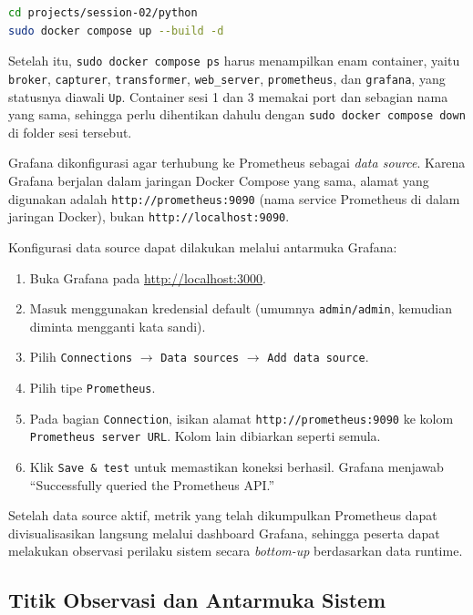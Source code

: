 \begin{enumerate}
\begin{lstlisting}[language=bash, caption={Membangun dan menjalankan seluruh container}, label={lst:ch02-11}]
cd projects/session-02/python
sudo docker compose up --build -d
\end{lstlisting}

Setelah itu, \texttt{sudo docker compose ps} harus menampilkan enam container, yaitu \texttt{broker}, \texttt{capturer}, \texttt{transformer}, \texttt{web\_server}, \texttt{prometheus}, dan \texttt{grafana}, yang statusnya diawali \texttt{Up}. Container sesi 1 dan 3 memakai port dan sebagian nama yang sama, sehingga perlu dihentikan dahulu dengan \texttt{sudo docker compose down} di folder sesi tersebut.



Grafana dikonfigurasi agar terhubung ke Prometheus sebagai \emph{data source}. Karena Grafana berjalan dalam jaringan Docker Compose yang sama, alamat yang digunakan adalah \texttt{http://prometheus:9090} (nama service Prometheus di dalam jaringan Docker), bukan \texttt{http://localhost:9090}.

Konfigurasi data source dapat dilakukan melalui antarmuka Grafana:
\begin{enumerate}
  \item Buka Grafana pada \url{http://localhost:3000}.
  \item Masuk menggunakan kredensial default (umumnya \texttt{admin/admin}, kemudian diminta mengganti kata sandi).
  \item Pilih \texttt{Connections} $\rightarrow$ \texttt{Data sources} $\rightarrow$ \texttt{Add data source}.
  \item Pilih tipe \texttt{Prometheus}.
  \item Pada bagian \texttt{Connection}, isikan alamat \texttt{http://prometheus:9090} ke kolom \texttt{Prometheus server URL}. Kolom lain dibiarkan seperti semula.
  \item Klik \texttt{Save \& test} untuk memastikan koneksi berhasil. Grafana menjawab ``Successfully queried the Prometheus API.''
\end{enumerate}

Setelah data source aktif, metrik yang telah dikumpulkan Prometheus dapat divisualisasikan langsung melalui dashboard Grafana, sehingga peserta dapat melakukan observasi perilaku sistem secara \emph{bottom-up} berdasarkan data runtime.

\end{enumerate}

\subsection{Titik Observasi dan Antarmuka Sistem}

